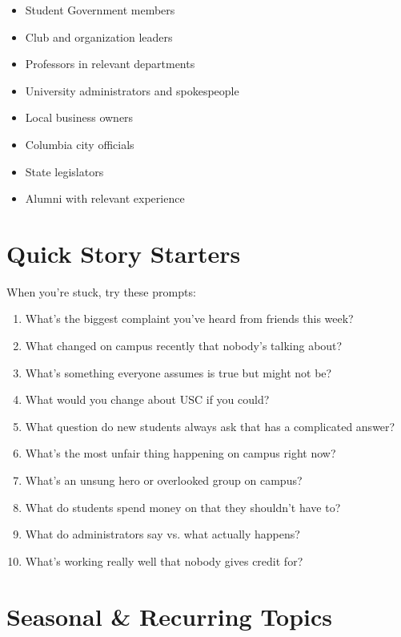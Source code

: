 \documentclass[12pt]{article}
\begin{document}
\begin{itemize}[leftmargin=*]
    \item Student Government members
    \item Club and organization leaders
    \item Professors in relevant departments
    \item University administrators and spokespeople
    \item Local business owners
    \item Columbia city officials
    \item State legislators
    \item Alumni with relevant experience
\end{itemize}

\section*{Quick Story Starters}

\begin{promptbox}
When you're stuck, try these prompts:
\begin{enumerate}[leftmargin=*]
    \item What's the biggest complaint you've heard from friends this week?
    \item What changed on campus recently that nobody's talking about?
    \item What's something everyone assumes is true but might not be?
    \item What would you change about USC if you could?
    \item What question do new students always ask that has a complicated answer?
    \item What's the most unfair thing happening on campus right now?
    \item What's an unsung hero or overlooked group on campus?
    \item What do students spend money on that they shouldn't have to?
    \item What do administrators say vs. what actually happens?
    \item What's working really well that nobody gives credit for?
\end{enumerate}
\end{promptbox}

\section*{Seasonal \& Recurring Topics}
\end{document}
